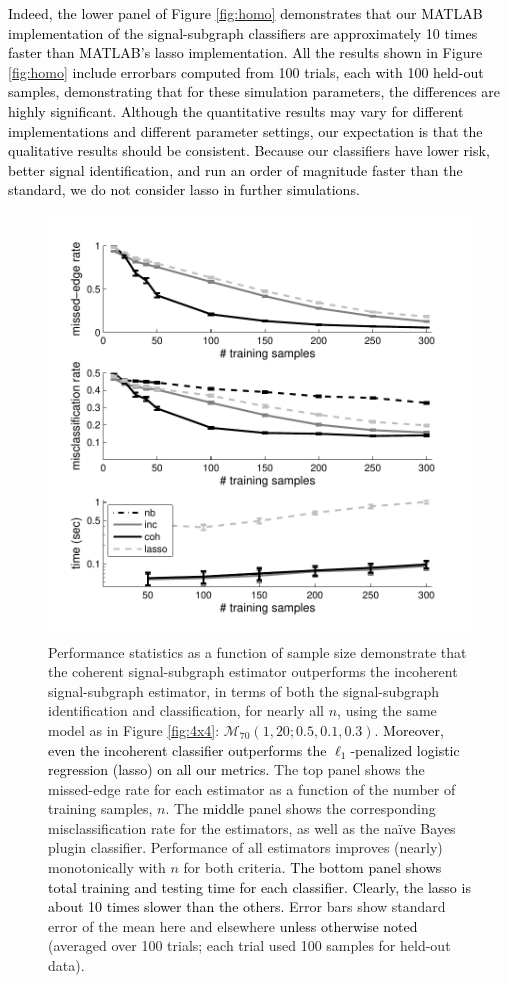 \documentclass[10pt,journal,cspaper,compsoc]{IEEEtran}
\providecommand{\tk}[1]{\textcolor{black}{#1}}
\providecommand{\mc}[1]{\mathcal{#1}}
\newcommand{\comment}[1]{}
\begin{document}
\tk{Indeed, the lower panel of Figure \ref{fig:homo} demonstrates that our MATLAB implementation of the signal-subgraph classifiers are approximately 10 times faster than MATLAB's lasso implementation.  All the results shown in Figure \ref{fig:homo} include errorbars computed from 100 trials, each with 100 held-out samples, demonstrating that for these simulation parameters, the differences are highly significant.  Although the quantitative results may vary for different implementations and different parameter settings, our expectation is that the qualitative results should be consistent.  Because our classifiers have lower risk, better signal identification, and run an order of magnitude faster than the standard, we do not consider lasso in further simulations.}


\begin{figure}[htbp]
	\centering
		\includegraphics[width=1.0\linewidth]{fig3_homo_V70_s20_p10_q30_Lhats.pdf}
	\caption{Performance statistics as a function of sample size demonstrate that the coherent signal-subgraph estimator outperforms the incoherent signal-subgraph estimator, in terms of both the signal-subgraph identification and classification, for nearly all $n$, using the same model as in Figure \ref{fig:4x4}: $\mc{M}_{70}(1,20;0.5,0.1,0.3)$.  \tk{Moreover, even the incoherent classifier outperforms the $\ell_1$-penalized logistic regression (lasso) on all our metrics.}	The top panel shows the missed-edge rate for each estimator as a function of the number of training samples, $n$.  The \tk{middle} \comment{bottom} panel shows the corresponding misclassification rate for the estimators, as well as the na\"ive Bayes plugin classifier.  Performance of all estimators improves (nearly) monotonically with $n$ for both criteria. \tk{The bottom panel shows total training and testing time for each classifier.  Clearly, the lasso is about 10 times slower than the others.} Error bars show standard error of the mean here and elsewhere \tk{unless otherwise noted} (averaged over 100 trials; each trial used 100 samples for held-out data). 
}
\end{figure}
\end{document}
